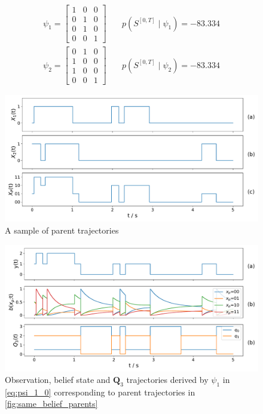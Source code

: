 \begin{align}
\psi_{1} =
\begin{bmatrix}
1 & 0 & 0 \\
0 & 1 & 0 \\
0 & 1 & 0 \\
0 & 0 & 1
\end{bmatrix} &\quad
p(S^{[0,T]} \mid \psi_1 ) = -83.334 \label{eq:psi_1_0}\\
\psi_{2} =
\begin{bmatrix}
0 & 1 & 0 \\
1 & 0 & 0 \\
1 & 0 & 0 \\
0 & 0 & 1
\end{bmatrix} &\quad
p(S^{[0,T]} \mid \psi_2 ) = -83.334
\label{eq:psi_29}
\end{align}
\begin{figure}[H]
	\begin{center}
		\includegraphics[width=.90\textwidth]{figures/equivalence_classes/same_belief/parent_traj}
		\caption{A sample of parent trajectories}
		\label{fig:same_belief_parents}
	\end{center}
\end{figure}
\begin{figure}[H]
	\begin{center}
		\includegraphics[width=.90\textwidth]{figures/equivalence_classes/same_belief/psi_0}
		\caption{Observation, belief state and $ \textbf{Q}_3 $ trajectories derived by $ \psi_1 $ in \autoref{eq:psi_1_0} corresponding to parent trajectories in \autoref{fig:same_belief_parents}}
		\label{fig:same_belief_psi_0}
	\end{center}
\end{figure}

